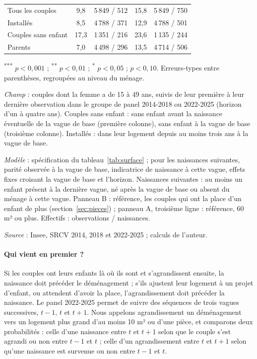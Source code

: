 \documentclass[11pt,a4paper]{article}
\theoremstyle{plain}
\theoremstyle{definition}
\theoremstyle{remark}
\newcommand{\sym}[1]{\textsuperscript{#1}}
\begin{document}
\begin{table}[htbp]
\begin{threeparttable}
\begin{tabular}{@{}lcccc@{}}
Tous les couples                     & 9,8 & 5\,849 / 512 & 15,8 & 5\,849 / 750 \\
Installés                            & 8,5 & 4\,788 / 371 & 12,9 & 4\,788 / 501 \\
Couples sans enfant                  & 17,3 & 1\,351 / 216 & 23,6 & 1\,135 / 244 \\
Parents                              & 7,0 & 4\,498 / 296 & 13,5 & 4\,714 / 506 \\
\bottomrule
\end{tabular}
\begin{tablenotes}\scriptsize
\item \sym{***} $p<0{,}001$ ; \sym{**} $p<0{,}01$ ; \sym{*} $p<0{,}05$ ; \sym{\dag} $p<0{,}10$. Erreurs-types entre parenthèses, regroupées au niveau du ménage.
\item \textit{Champ} : couples dont la femme a de 15 à 49 ans, suivis de leur première à leur dernière observation dans le groupe de panel 2014-2018 ou 2022-2025 (horizon d'un à quatre ans). Couples sans enfant : sans enfant avant la naissance éventuelle de la vague de base (première colonne), sans enfant à la vague de base (troisième colonne). Installés : dans leur logement depuis au moins trois ans à la vague de base.
\item \textit{Modèle} : spécification du tableau~\ref{tab:surface} ; pour les naissances suivantes, parité observée à la vague de base, indicatrice de naissance à cette vague, effets fixes croisant la vague de base et l'horizon. Naissances suivantes : au moins un enfant présent à la dernière vague, né après la vague de base ou absent du ménage à cette vague. Panneau B : référence, les couples qui ont la place d'un enfant de plus (section~\ref{sec:pieces}) ; panneau A, troisième ligne : référence, 60 m² ou plus. Effectifs : observations / naissances.
\item \textit{Source} : Insee, SRCV 2014, 2018 et 2022-2025 ; calculs de l'auteur.
\end{tablenotes}
\end{threeparttable}
\end{table}

\paragraph{Qui vient en premier ?} Si les couples ont leurs enfants là où ils sont et s'agrandissent ensuite, la naissance doit précéder le déménagement ; s'ils ajustent leur logement à un projet d'enfant, ou attendent d'avoir la place, l'agrandissement doit précéder la naissance. Le panel 2022-2025 permet de suivre des séquences de trois vagues successives, $t-1$, $t$ et $t+1$. Nous appelons agrandissement un déménagement vers un logement plus grand d'au moins 10 m² ou d'une pièce, et comparons deux probabilités : celle d'une naissance entre $t$ et $t+1$ selon que le couple s'est agrandi ou non entre $t-1$ et $t$ ; celle d'un agrandissement entre $t$ et $t+1$ selon qu'une naissance est survenue ou non entre $t-1$ et $t$.
\end{document}
